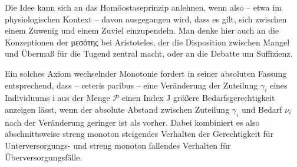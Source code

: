 \documentclass[a4paper]{thesis}
\begin{document}
Die Idee kann sich an das Homöostaseprinzip anlehnen, wenn also -- etwa im physiologischen Kontext -- davon ausgegangen wird, dass es gilt, sich zwischen einem Zuwenig und einem Zuviel einzupendeln. Man denke hier auch an die Konzeptionen der \textgreek{μεσότης} bei Aristoteles, der die Disposition zwischen Mangel und Übermaß für die Tugend zentral macht, oder an die Debatte um Suffizienz.

Ein solches Axiom wechselnder Monotonie fordert in seiner absoluten Fassung entsprechend, dass -- ceteris paribus -- eine Veränderung der Zuteilung $\gamma_i$ eines Individuums i aus der Menge $\mathcal{P}$ einen Index J größere Bedarfsgerechtigkeit anzeigen lässt, wenn der absolute Abstand zwischen Zuteilung $\gamma_i$ und Bedarf $\nu_i$ nach der Veränderung geringer ist als vorher. Dabei kombiniert es also abschnittsweise streng monoton steigendes Verhalten der Gerechtigkeit für Unterversorgungs- und streng monoton fallendes Verhalten für Überversorgungsfälle.
\end{document}
